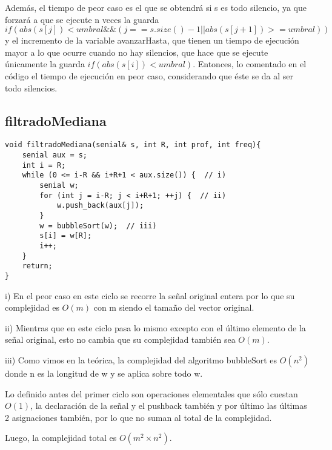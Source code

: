 \documentclass{article}
\begin{document}
Además, el tiempo de peor caso es el que se obtendrá si s es todo silencio, ya que forzará a que se ejecute n
veces la guarda $if(abs(s[j]) < umbral \&\& (j == s.size()-1 || abs(s[j+1]) >= umbral))$ y el incremento de
la variable avanzarHasta, que tienen un tiempo de ejecución mayor a lo que ocurre cuando no hay silencios,
que hace que se ejecute únicamente la guarda $if(abs(s[i]) < umbral)$. Entonces, lo comentado en el código el tiempo de
ejecución en peor caso, considerando que éste se da al ser todo silencios.


\newpage
\subsection{filtradoMediana}
\begin{lstlisting}
void filtradoMediana(senial& s, int R, int prof, int freq){
    senial aux = s;
    int i = R;
    while (0 <= i-R && i+R+1 < aux.size()) {  // i)
        senial w;
        for (int j = i-R; j < i+R+1; ++j) {  // ii)
            w.push_back(aux[j]);
        }
        w = bubbleSort(w);  // iii)
        s[i] = w[R];
        i++;
    }
    return;
}
\end{lstlisting}

i) En el peor caso en este ciclo se recorre la señal original entera por lo que su complejidad es $O(m)$ con m siendo el tamaño del vector original.

ii) Mientras que en este ciclo pasa lo mismo excepto con el último elemento de la señal original, esto no cambia que su complejidad también sea $O(m)$.

iii) Como vimos en la teórica, la complejidad del algoritmo bubbleSort es $O(n^2)$ donde n es la longitud de w y se aplica sobre todo w.

Lo definido antes del primer ciclo son operaciones elementales que sólo cuestan $O(1)$, la declaración de la señal y el pushback también y por último las últimas 2 asignaciones también, por lo que no suman al total de la complejidad.

Luego, la complejidad total es $O(m^2 \times n^2)$.
\end{document}
